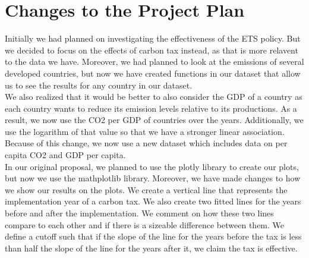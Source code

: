 \documentclass[fontsize=11pt]{article}
\begin{document}
\section*{Changes to the Project Plan}
Initially we had planned on investigating the effectiveness of the ETS policy. But we decided to focus on the effects of carbon tax instead, as that is more relavent to the data we have. Moreover, we had planned to look at the emissions of several developed countries, but now we have created functions in our dataset that allow us to see the results for any country in our dataset. \\

\noindent We also realized that it would be better to also consider the GDP of a country as each country wants to reduce its emission levels relative to its productions. As a result, we now use the CO2 per GDP of countries over the years. Additionally, we use the logarithm of that value so that we have a stronger linear association. Because of this change, we now use a new dataset which includes data on per capita CO2 and GDP per capita.\\

\noindent In our original proposal, we planned to use the plotly library to create our plots, but now we use the mathplotlib library. Moreover, we have made changes to how we show our results on the plots. We create a vertical line that represents the implementation year of a carbon tax. We also create two fitted lines for the years before and after the implementation. We comment on how these two lines compare to each other and if there is a sizeable difference between them. We define a cutoff such that if the slope of the line for the years before the tax is less than half the slope of the line for the years after it, we claim the tax is effective.
\end{document}
